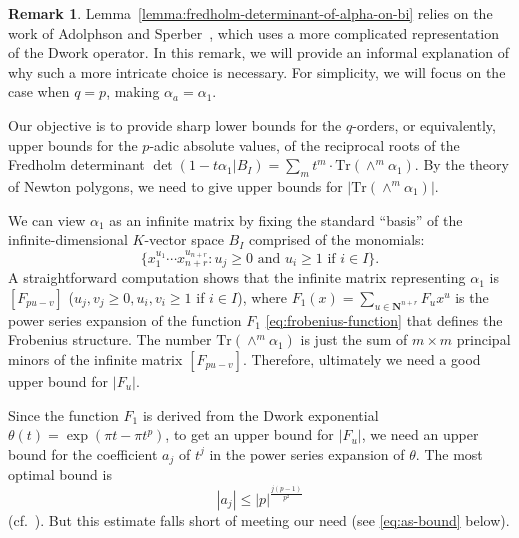 \documentclass{amsart}
\numberwithin{equation}{section}
\theoremstyle{plain}
\theoremstyle{definition}
\newtheorem{remark}[equation]{Remark}
\renewcommand{\mathbb}{\mathbf}
\begin{document}
\begin{remark}%
Lemma~\ref{lemma:fredholm-determinant-of-alpha-on-bi} relies on the
work of Adolphson and
Sperber~\cite[Proposition~4.2]{adolphson-sperber:chevalley-warning},
which uses a more complicated representation of the Dwork operator.
In this remark, we will provide an informal explanation of why such a
more intricate choice is necessary.  For simplicity, we will focus on
the case when \(q=p\), making \(\alpha_{a} = \alpha_{1}\).


Our objective is to provide sharp lower bounds for the \(q\)-orders,
or equivalently, upper bounds for the \(p\)-adic absolute values, of
the reciprocal roots of the Fredholm determinant
\(\det(1-t\alpha_{1} | B_{I}) = \sum_{m} t^{m} \cdot
\mathrm{Tr}(\wedge^{m}\alpha_{1})\).  By the theory of Newton
polygons, we need to give upper bounds for
\(|\mathrm{Tr}(\wedge^{m}\alpha_{1})|\).

We can view \(\alpha_{1}\) as an infinite matrix by fixing the
standard ``basis'' of the infinite-dimensional \(K\)-vector space
\(B_{I}\) comprised of the monomials:
\begin{equation}
\label{eq:basis-again}
\{x_{1}^{u_{1}}\cdots x_{n+r}^{u_{n+r}}:u_{j}\geq0\text{ and }u_{i}\geq 1\text{ if }i\in I\}.
\end{equation}
A straightforward computation shows that the infinite matrix
representing \(\alpha_{1}\) is \([F_{pu-v}]\)
(\(u_{j},v_{j}\geq0, u_{i},v_{i}\geq 1\) if \(i \in I\)), where
\(F_{1}(x) = \sum_{u\in\mathbb{N}^{n+r}} F_{u} x^{u}\) is the power
series expansion of the function \(F_{1}\)
\eqref{eq:frobenius-function} that defines the Frobenius structure.
The number \(\mathrm{Tr}(\wedge^{m}\alpha_{1})\) is just the sum of
\(m \times m\) principal minors of the infinite matrix
\([F_{pu-v}]\). Therefore, ultimately we need a good upper bound for
\(|F_{u}|\).

Since the function \(F_{1}\) is derived from the Dwork exponential
\(\theta(t) = \exp(\pi t - \pi t^{p})\), to get an upper bound for
\(|F_{u}|\), we need an upper bound for the coefficient \(a_{j}\) of
\(t^{j}\) in the power series expansion of \(\theta\).  The most
optimal bound is
\begin{equation}
\label{eq:dwork-exp-bound}
|a_{j}| \leq |p|^{\frac{j(p-1)}{p^{2}}}
\end{equation}
(cf.~\cite[Eq.~(4.7) and p.~57, line 1]{dwork:zeta-function-hypersurface-1}).
But this estimate falls short of meeting our need (see
\eqref{eq:as-bound} below).


\end{remark}
\end{document}
